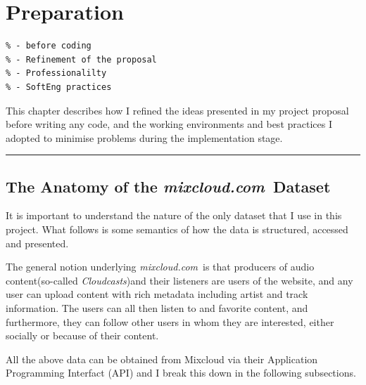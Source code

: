 \documentclass[a4paper,12pt,twoside,notitlepage]{report}
\def\mixurl{\emph{mixcloud.com}}
\newcommand{\rulewidth}{300pt}
\newcommand{\halfrule}{
  \begin{center}
    {\rule{\rulewidth}{0.5pt}}
  \end{center}}
\begin{document}
\chapter{Preparation}

\begin{verbatim}
% - before coding
% - Refinement of the proposal
% - Professionalilty
% - SoftEng practices 
\end{verbatim}

This chapter describes how I refined the ideas presented in my project proposal
before writing any code, and the working environments and best practices I
adopted to minimise problems during the implementation stage.

\halfrule

\section{The Anatomy of the \mixurl\ Dataset}

It is important to understand the nature of the only dataset that I use in this
project. What follows is some semantics of how the data is structured, accessed
and presented. 

The general notion underlying \mixurl\ is that producers of audio
content(so-called \emph{Cloudcasts})and their listeners are users of the
website, and any user can upload content with rich metadata including artist and
track information. The users can all then listen to and favorite content, and
furthermore, they can follow other users in whom they are interested, either
socially or because of their content.

All the above data can be obtained from Mixcloud via their Application
Programming Interfact (API) and I break this down in the following subsections.
\end{document}
